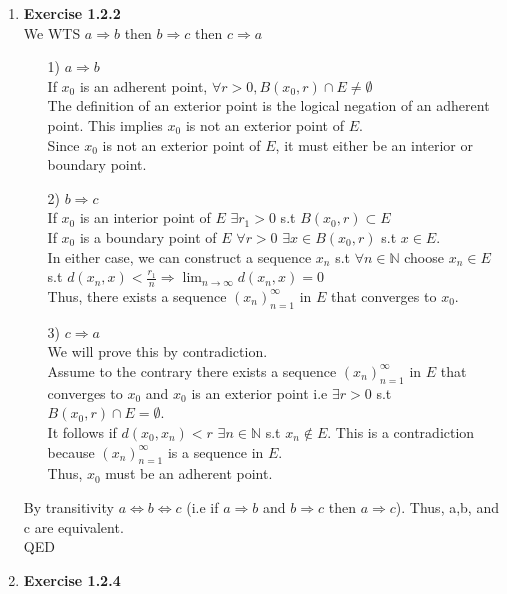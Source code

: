 \documentclass[10pt]{article}
\begin{document}
\begin{enumerate}[label=\bfseries Problem \arabic*:]
    \item \textbf{Exercise 1.2.2}\\
    We WTS $a\Rightarrow b$ then $b\Rightarrow c$ then $c\Rightarrow a$
    \begin{itemize}
        \item [1)]$a\Rightarrow b$\\
        If $x_0$ is an adherent point, $\forall r>0,B(x_0,r)\cap E\neq \emptyset$\\
        The definition of an exterior point is the logical negation of an adherent point. This implies $x_0$ is not an exterior point of $E$.\\
        Since $x_0$ is not an exterior point of $E$, it must either be an interior or boundary point.
        \item [2)]$b\Rightarrow c$\\
        If $x_0$ is an interior point of $E$ $\exists r_1>0$ s.t $B(x_0,r)\subset E$\\
        If $x_0$ is a boundary point of  $E$ $\forall r>0$ $\exists x \in B(x_0,r)$ s.t $x \in E$.\\
        In either case, we can construct a sequence $x_n$ s.t $\forall n \in \mathbb{N}$ choose $x_n\in E$ s.t $d(x_n,x)<\frac{r_1}{n}\Rightarrow \displaystyle{\lim_{n\rightarrow\infty}}d(x_n,x)=0$\\
        Thus, there exists a sequence ${(x_n)}_{n=1}^{\infty}$ in $E$ that converges to $x_0$.
        \item [3)] $c\Rightarrow a$\\
        We will prove this by contradiction.\\
        Assume to the contrary there exists a sequence ${(x_n)}_{n=1}^{\infty}$ in $E$ that converges to $x_0$ and $x_0$ is an exterior point i.e $\exists r>0$ s.t $B(x_0,r)\cap E=\emptyset$.\\
        It follows if $d(x_0,x_n)<r$ $\exists n \in \mathbb{N}$ s.t $x_n \notin E$.
        This is a contradiction because ${(x_n)}_{n=1}^{\infty}$ is a sequence in $E$.\\
        Thus, $x_0$ must be an adherent point.
    \end{itemize}
    By transitivity $a \Leftrightarrow b \Leftrightarrow c$ (i.e if $a \Rightarrow b$ and $b \Rightarrow c$ then $a \Rightarrow c$). Thus, a,b, and c are equivalent.\\
    QED
    \item \textbf{Exercise 1.2.4}
    \begin{itemize}

\end{itemize}
\end{enumerate}
\end{document}
